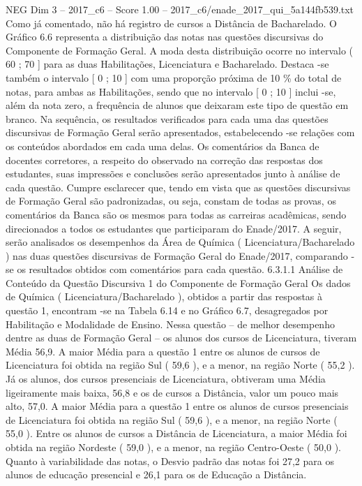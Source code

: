 \begin{textsample}{NEG Dim 3 – 2017\_c6 – Score 1.00 – 2017\_c6/enade\_2017\_qui\_5a144fb539.txt}
Como já comentado, não há registro de cursos a Distância de Bacharelado.
O Gráfico 6.6 representa a distribuição das notas nas questões discursivas do Componente de Formação Geral.
A moda desta distribuição ocorre no intervalo ( 60 ; 70 ] para as duas Habilitações, Licenciatura e Bacharelado.
Destaca -se também o intervalo [ 0 ; 10 ] com uma proporção próxima de 10 \% do total de notas, para ambas as Habilitações, sendo que no intervalo [ 0 ; 10 ] inclui -se, além da nota zero, a frequência de alunos que deixaram este tipo de questão em branco.
Na sequência, os resultados verificados para cada uma das questões discursivas de Formação Geral serão apresentados, estabelecendo -se relações com os conteúdos abordados em cada uma delas.
Os comentários da Banca de docentes corretores, a respeito do observado na correção das respostas dos estudantes, suas impressões e conclusões serão apresentados junto à análise de cada questão.
Cumpre esclarecer que, tendo em vista que as questões discursivas de Formação Geral são padronizadas, ou seja, constam de todas as provas, os comentários da Banca são os mesmos para todas as carreiras acadêmicas, sendo direcionados a todos os estudantes que participaram do Enade/2017.
A seguir, serão analisados os desempenhos da Área de Química ( Licenciatura/Bacharelado ) nas duas questões discursivas de Formação Geral do Enade/2017, comparando -se os resultados obtidos com comentários para cada questão. 6.3.1.1 Análise de Conteúdo da Questão Discursiva 1 do Componente de Formação Geral Os dados de Química ( Licenciatura/Bacharelado ), obtidos a partir das respostas à questão 1, encontram -se na Tabela 6.14 e no Gráfico 6.7, desagregados por Habilitação e Modalidade de Ensino.
Nessa questão – de melhor desempenho dentre as duas de Formação Geral – os alunos dos cursos de Licenciatura, tiveram Média 56,9.
A maior Média para a questão 1 entre os alunos de cursos de Licenciatura foi obtida na região Sul ( 59,6 ), e a menor, na região Norte ( 55,2 ).
Já os alunos, dos cursos presenciais de Licenciatura, obtiveram uma Média ligeiramente mais baixa, 56,8 e os de cursos a Distância, valor um pouco mais alto, 57,0.
A maior Média para a questão 1 entre os alunos de cursos presenciais de Licenciatura foi obtida na região Sul ( 59,6 ), e a menor, na região Norte ( 55,0 ).
Entre os alunos de cursos a Distância de Licenciatura, a maior Média foi obtida na região Nordeste ( 59,0 ), e a menor, na região Centro-Oeste ( 50,0 ).
Quanto à variabilidade das notas, o Desvio padrão das notas foi 27,2 para os alunos de educação presencial e 26,1 para os de Educação a Distância.

\end{textsample}
